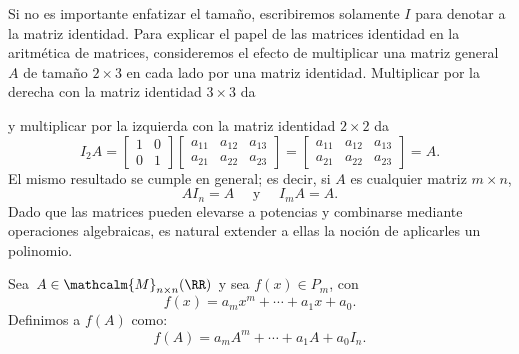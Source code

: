 Si no es importante enfatizar el tamaño, escribiremos solamente $I$ para denotar a la matriz identidad. Para explicar el papel de las matrices identidad en la aritmética de matrices, consideremos el efecto de multiplicar una matriz general $A$ de tamaño $2 \times 3$ en cada lado por una matriz identidad. Multiplicar por la derecha con la matriz identidad $3 \times 3$ da
\begin{matrizn}
\end{matrizn}
y multiplicar por la izquierda con la matriz identidad $2 \times 2$ da
$$I_2 A = \begin{bmatrix}
    1 & 0 \\
    0 & 1
\end{bmatrix} \begin{bmatrix}
    a_{11} & a_{12} & a_{13} \\
    a_{21} & a_{22} & a_{23}
\end{bmatrix} = \begin{bmatrix}
    a_{11} & a_{12} & a_{13} \\
    a_{21} & a_{22} & a_{23}
\end{bmatrix} = A.$$
El mismo resultado se cumple en general; es decir, si $A$ es cualquier matriz $m \times n$,%
$$A I_n = A \quad \text{ y } \quad I_m A = A.$$
Dado que las matrices pueden elevarse a potencias y combinarse mediante operaciones algebraicas, es natural extender a ellas la noción de aplicarles un polinomio.

\begin{definicion}{}{}
    Sea $A \in \mathcalm{M}_{n \times n} (\RR)$ y sea $f(x) \in P_m$, con
    $$f(x) = a_mx^m + \cdots + a_1x + a_0.$$
    Definimos a $f(A)$ como:
    $$f(A) = a_mA^m + \cdots + a_1A + a_0I_n.$$
\end{definicion}

\newpage


